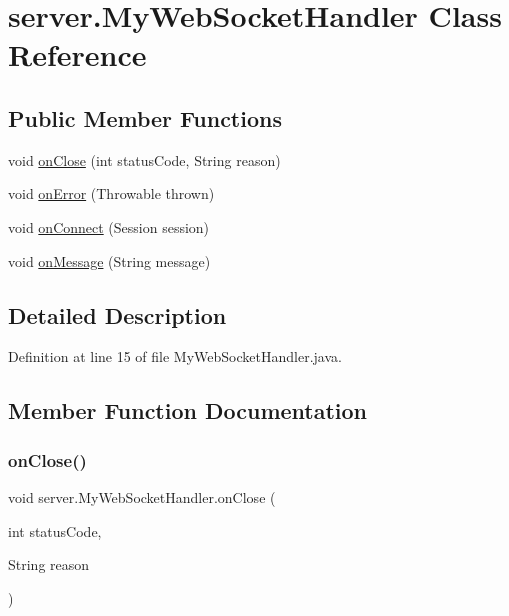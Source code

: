 \hypertarget{classserver_1_1_my_web_socket_handler}{}\section{server.\+My\+Web\+Socket\+Handler Class Reference}
\label{classserver_1_1_my_web_socket_handler}
\subsection*{Public Member Functions}
\begin{DoxyCompactItemize}
\item 
void \hyperlink{classserver_1_1_my_web_socket_handler_a5e3913fe552aa08c6e80f79ff3d3fc01}{on\+Close} (int status\+Code, String reason)
\item 
void \hyperlink{classserver_1_1_my_web_socket_handler_ab232bcea3e901fe731840e6de8c1544b}{on\+Error} (Throwable thrown)
\item 
void \hyperlink{classserver_1_1_my_web_socket_handler_aeff7fa4f5f0e42526174016f05101ba4}{on\+Connect} (Session session)
\item 
void \hyperlink{classserver_1_1_my_web_socket_handler_ad10604d60be64a1af67abba528769fd7}{on\+Message} (String message)
\end{DoxyCompactItemize}


\subsection{Detailed Description}


Definition at line 15 of file My\+Web\+Socket\+Handler.\+java.



\subsection{Member Function Documentation}
\hypertarget{classserver_1_1_my_web_socket_handler_a5e3913fe552aa08c6e80f79ff3d3fc01}{}\label{classserver_1_1_my_web_socket_handler_a5e3913fe552aa08c6e80f79ff3d3fc01} 
\subsubsection{\texorpdfstring{on\+Close()}{onClose()}}
{\footnotesize\ttfamily void server.\+My\+Web\+Socket\+Handler.\+on\+Close (\begin{DoxyParamCaption}\item[{int}]{status\+Code,  }\item[{String}]{reason }\end{DoxyParamCaption})}



